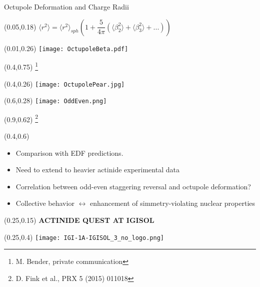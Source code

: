 \documentclass[10pt,aspectratio=169]{beamer}
\begin{document}
\begin{frame}{Octupole Deformation and Charge Radii}
	\begin{textblock*}{0.9\paperwidth}(0.05\paperwidth,0.18\paperheight)
		\centering
		$\langle r^2 \rangle = \langle r^2 \rangle_{sph} \left( 1+\dfrac{5}{4 \pi}\left( \langle \beta^2_2\rangle+\langle \beta^2_3\rangle+...\right)\right)$
	\end{textblock*}
	\begin{textblock*}{0.4\paperwidth}(0.01\paperwidth,0.26\paperheight)
		\texttt{[image: OctupoleBeta.pdf]}
	\end{textblock*}
	\begin{textblock*}{0.1\paperwidth}(0.4\paperwidth,0.75\paperheight)
		\footnote{M. Bender, private communication}
	\end{textblock*}
	\begin{textblock*}{0.15\paperwidth}(0.4\paperwidth,0.26\paperheight)
		\texttt{[image: OctupolePear.jpg]}
	\end{textblock*}
	\begin{textblock*}{0.4\paperwidth}(0.6\paperwidth,0.28\paperheight)
		\texttt{[image: OddEven.png]}
	\end{textblock*}
	\begin{textblock*}{0.1\paperwidth}(0.9\paperwidth,0.62\paperheight)
		\footnote{D. Fink et al., PRX 5 (2015) 011018}
	\end{textblock*}
	\begin{textblock*}{0.6\paperwidth}(0.4\paperwidth,0.6\paperheight)
		\small	
		\begin{itemize}
				\item Comparison with EDF predictions. 
				\item Need to extend to heavier actinide experimental data
				\item Correlation between odd-even staggering reversal and octupole deformation?
				\item Collective behavior $\leftrightarrow$ enhancement of simmetry-violating nuclear properties
			\end{itemize}
	\end{textblock*}
\end{frame}


\begin{SectionTitle}
	\begin{frame}
		\centering
		\begin{textblock*}{0.5\paperwidth}(0.25\paperwidth,0.15\paperheight)
			\centering
			\textbf{\LARGE ACTINIDE QUEST AT IGISOL}	
		\end{textblock*}
		\begin{textblock*}{0.5\paperwidth}(0.25\paperwidth,0.4\paperheight)
			\texttt{[image: IGI-1A-IGISOL\_3\_no\_logo.png]}
		\end{textblock*}
	\end{frame}
\end{SectionTitle}
\end{document}
